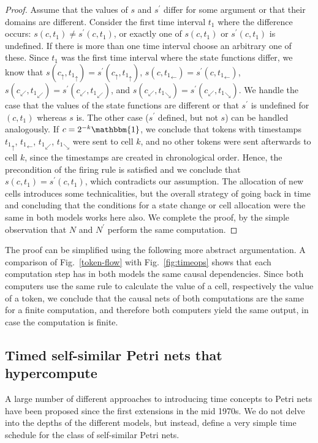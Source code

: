 \documentclass[pre,showpacs,showkeys,preprint]{revtex4}
\theoremstyle{definition}
\begin{document}
\begin{proof}
Assume that the values of $s$ and $s^\prime$ differ for some argument or that their domains are different.
Consider the first time interval $t_1$ where the difference occurs:
$s(c,t_1) \neq s^\prime(c,t_1)$, or exactly one of $s(c,t_1)$ or $s^\prime(c,t_1)$ is undefined.
If there is more than one time interval choose an arbitrary one of these.
Since $t_1$ was the first time interval where the state functions differ, we know that
$s(c_\uparrow, {t_1}_\uparrow) = s^\prime(c_\uparrow, {t_1}_\uparrow)$,
$s(c, {t_1}_\leftarrow) = s^\prime(c, {t_1}_\leftarrow)$,
$s(c_\swarrow, {t_1}_\swarrow) = s^\prime(c_\swarrow, {t_1}_\swarrow)$, and
$s(c_\swarrow, {t_1}_\searrow)= s^\prime(c_\swarrow, {t_1}_\searrow)$.
We handle the case that the values of the state functions are different or that $s^\prime$ is undefined for $(c,t_1)$ whereas $s$ is.
The other case ($s^\prime$ defined, but not $s$) can be handled analogously.
If $c = 2^{-k} \mathbbm{1}$, we conclude that tokens with timestamps ${t_1}_\uparrow$, ${t_1}_\leftarrow$, ${t_1}_\swarrow$, ${t_1}_\searrow$ were sent
to cell $k$, and no other tokens were sent afterwards to cell $k$, since the timestamps are created in
chronological order.
Hence, the precondition of the firing rule is satisfied and we conclude that $s(c,t_1) = s^\prime(c,t_1)$, which contradicts our assumption.
The allocation of new cells introduces some technicalities, but the overall strategy of going back in time
and concluding that the conditions for a state change or cell allocation were the same in both models works here also.
We complete the proof, by the simple observation that $N$ and $N^\prime$ perform the same computation.
\end{proof}
The proof can be simplified using the following more abstract argumentation.
A comparison of Fig.~\ref{token-flow} with Fig.~\ref{fig:timeops} shows that each computation step has in both models
the same causal dependencies.
Since both computers use the same rule to calculate the value of a cell, respectively the value of a token,
we conclude that the causal nets \cite{Levin81} of both computations are the same for a finite computation,
and therefore both computers yield the same output, in case the computation is finite.

\subsection{Timed self-similar Petri nets that hypercompute}

A large number of different approaches to introducing time concepts to
Petri nets have been proposed since the first extensions in the mid 1970s.
We do not delve into the depths of the different models, but instead,
define a very simple time schedule for the class of self-similar Petri nets.
\end{document}

